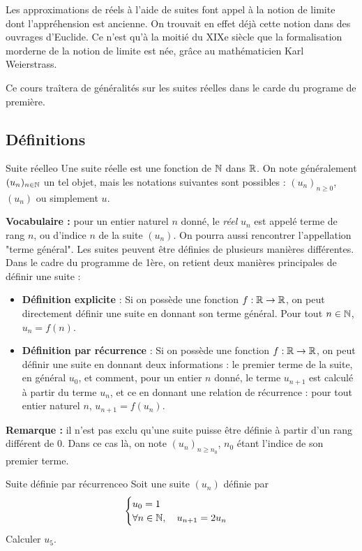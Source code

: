 Les approximations de réels à l'aide de suites font appel à la notion de limite dont l'appréhension est ancienne. On trouvait en effet déjà cette notion dans des ouvrages d'Euclide. Ce n'est qu'à la moitié du XIXe siècle que la formalisation morderne de la notion de limite est née, grâce au mathématicien Karl Weierstrass.


Ce cours traîtera de généralités sur les suites réelles dans le carde du programe de première.

\subsection{Définitions}

\begin{definition}{Suite réelle}{o}
Une suite réelle est une fonction de $\mathbb{N}$ dans $\mathbb{R}$. On note généralement $(u_n)_{n\in\mathbb{N}}$ un tel objet, mais les notations suivantes sont possibles : $(u_n)_{n\geq 0}$, $(u_n)$ ou simplement $u$.
\end{definition}
\textbf{Vocabulaire :} pour un entier naturel $n$ donné, le \textit{réel} $u_n$ est appelé terme de rang $n$, ou d'indice $n$ de la suite $(u_n)$. On pourra aussi rencontrer l'appellation "terme général".
Les suites peuvent être définies de plusieurs manières différentes. Dans le cadre du programme de 1ère, on retient deux manières principales de définir une suite : 
\begin{itemize}
	\item \textbf{Définition explicite} : Si on possède une fonction $f:\mathbb{R}\to\mathbb{R}$, on peut directement définir une suite en donnant son terme général. Pour tout $n\in\mathbb{N}$, $u_n=f(n)$.
	\item \textbf{Définition par récurrence} : Si on possède une fonction $f:\mathbb{R}\to\mathbb{R}$, on peut définir une suite en donnant deux informations : le premier terme de la suite, en général $u_0$, et comment, pour un entier $n$ donné, le terme $u_{n+1}$ est calculé à partir du terme $u_n$, et ce en donnant une relation de récurrence : pour tout entier naturel $n$, $u_{n+1}=f(u_n)$.
\end{itemize}
\textbf{Remarque :} il n'est pas exclu qu'une suite puisse être définie à partir d'un rang différent de $0$. Dans ce cas là, on note $(u_n)_{n\geq n_0}$, $n_0$ étant l'indice de son premier terme.

\begin{exemple}{Suite définie par récurrence}{o}
Soit une suite $(u_n)$ définie par \[\begin{cases}u_0=1\\ \forall n\in\mathbb{N},\quad u_{n+1}=2u_n\end{cases}\]
Calculer $u_5$.
\end{exemple}

